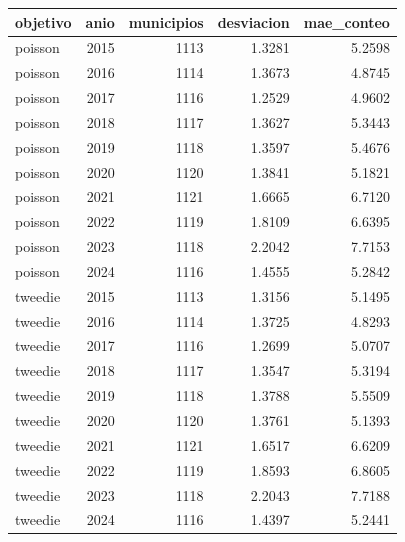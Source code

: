 \begin{tabular}{lrrrr}
\toprule
objetivo & anio & municipios & desviacion & mae\_conteo \\
\midrule
poisson & 2015 & 1113 & 1.3281 & 5.2598 \\
poisson & 2016 & 1114 & 1.3673 & 4.8745 \\
poisson & 2017 & 1116 & 1.2529 & 4.9602 \\
poisson & 2018 & 1117 & 1.3627 & 5.3443 \\
poisson & 2019 & 1118 & 1.3597 & 5.4676 \\
poisson & 2020 & 1120 & 1.3841 & 5.1821 \\
poisson & 2021 & 1121 & 1.6665 & 6.7120 \\
poisson & 2022 & 1119 & 1.8109 & 6.6395 \\
poisson & 2023 & 1118 & 2.2042 & 7.7153 \\
poisson & 2024 & 1116 & 1.4555 & 5.2842 \\
tweedie & 2015 & 1113 & 1.3156 & 5.1495 \\
tweedie & 2016 & 1114 & 1.3725 & 4.8293 \\
tweedie & 2017 & 1116 & 1.2699 & 5.0707 \\
tweedie & 2018 & 1117 & 1.3547 & 5.3194 \\
tweedie & 2019 & 1118 & 1.3788 & 5.5509 \\
tweedie & 2020 & 1120 & 1.3761 & 5.1393 \\
tweedie & 2021 & 1121 & 1.6517 & 6.6209 \\
tweedie & 2022 & 1119 & 1.8593 & 6.8605 \\
tweedie & 2023 & 1118 & 2.2043 & 7.7188 \\
tweedie & 2024 & 1116 & 1.4397 & 5.2441 \\
\bottomrule
\end{tabular}
